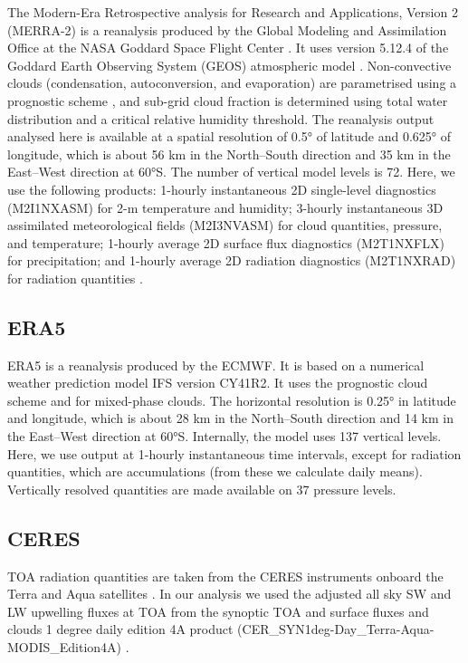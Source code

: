 \documentclass[12pt,a4paper]{article}
\begin{document}
The Modern-Era Retrospective analysis for Research and Applications, Version 2
(MERRA-2) is a reanalysis produced by the Global Modeling and Assimilation
Office at the NASA Goddard Space Flight Center \citep{gelaro2017}.  It uses
version 5.12.4 of the Goddard Earth Observing System (GEOS) atmospheric model
\citep{rienecker2008,molod2015}. Non-convective clouds (condensation, autoconversion, and evaporation) are parametrised using a prognostic scheme \citep{bacmeister2006}, and sub-grid cloud fraction is determined using total water distribution and a critical relative humidity threshold. The reanalysis output analysed here is
available at a spatial resolution of 0.5° of latitude and 0.625° of longitude,
which is about 56 km in the North--South direction and 35 km in the East--West
direction at 60°S. The number of vertical model levels is 72. Here, we use the
following products: 1-hourly instantaneous 2D single-level diagnostics
(M2I1NXASM) for 2-m temperature and humidity; 3-hourly instantaneous 3D
assimilated meteorological fields (M2I3NVASM) for cloud quantities, pressure,
and temperature; 1-hourly average 2D surface flux diagnostics (M2T1NXFLX) for
precipitation; and 1-hourly average 2D radiation diagnostics
(M2T1NXRAD) for radiation quantities \citep{merra2}.

\subsection{ERA5}

ERA5 \citep{era5} is a reanalysis produced by the ECMWF.  It is based on a
numerical weather prediction model IFS version CY41R2.  It uses the \cite{tiedtke1993} prognostic cloud scheme and \cite{forbes2014} for mixed-phase clouds. The horizontal
resolution is 0.25° in latitude and longitude, which is about 28 km in the
North--South direction and 14 km in the East--West direction at 60°S.
Internally, the model uses 137 vertical levels. Here, we use output at 1-hourly
instantaneous time intervals, except for radiation quantities, which are
accumulations (from these we calculate daily means).  Vertically resolved
quantities are made available on 37 pressure levels.

\subsection{CERES}

TOA radiation quantities are taken from the CERES instruments onboard the
Terra and Aqua satellites \citep{wielicki1996,loeb2018}. In our analysis we
used the adjusted all sky SW and LW upwelling fluxes at TOA from the synoptic
TOA and surface fluxes and clouds 1 degree daily edition 4A product
(CER\_SYN1deg-Day\_Terra-Aqua-MODIS\_Edition4A)
\citep{doelling2013,doelling2016}.
\end{document}
